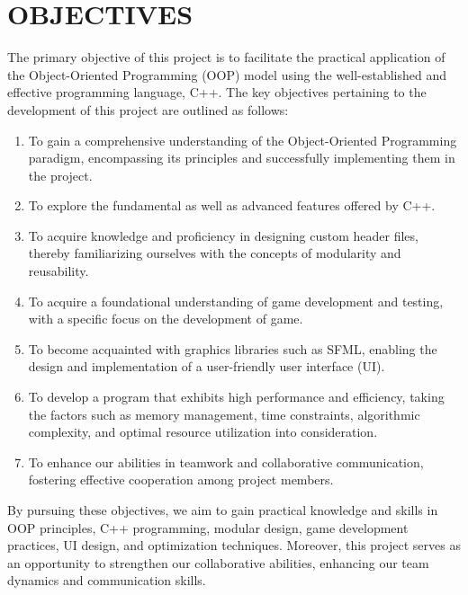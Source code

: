\newpage
{}
\section{OBJECTIVES}
The primary objective of this project is to facilitate the practical application of the Object-Oriented Programming (OOP) model using the well-established and effective programming language, C++. The key objectives pertaining to the development of this project are outlined as follows:

\begin{enumerate}
	\item To gain a comprehensive understanding of the Object-Oriented Programming paradigm, encompassing its principles and successfully implementing them in the project.
	\item To explore the fundamental as well as advanced features offered by C++.
	\item To acquire knowledge and proficiency in designing custom header files, thereby familiarizing ourselves with the concepts of modularity and reusability.
	\item To acquire a foundational understanding of game development and testing, with a specific focus on the development of game.
	\item To become acquainted with graphics libraries such as SFML, enabling the design and implementation of a user-friendly user interface (UI).
	\item To develop a program that exhibits high performance and efficiency, taking the factors such as memory management, time constraints, algorithmic complexity, and optimal resource utilization into consideration. 
	\item To enhance our abilities in teamwork and collaborative communication, fostering effective cooperation among project members.
	
\end{enumerate}

By pursuing these objectives, we aim to gain practical knowledge and skills in OOP principles, C++ programming, modular design, game development practices, UI design, and optimization techniques. Moreover, this project serves as an opportunity to strengthen our collaborative abilities, enhancing our team dynamics and communication skills.
